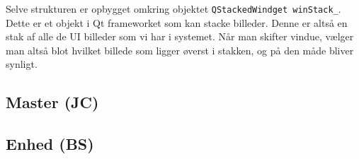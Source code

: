 Selve strukturen er opbygget omkring objektet \verb+QStackedWindget winStack_+. Dette er et objekt i Qt frameworket som kan stacke billeder. Denne er altså en stak af alle de UI billeder som vi har i systemet. Når man skifter vindue, vælger man altså blot hvilket billede som ligger øverst i stakken, og på den måde bliver synligt. 

\subsection{Master (JC)}


\clearpage

\subsection{Enhed (BS)}


